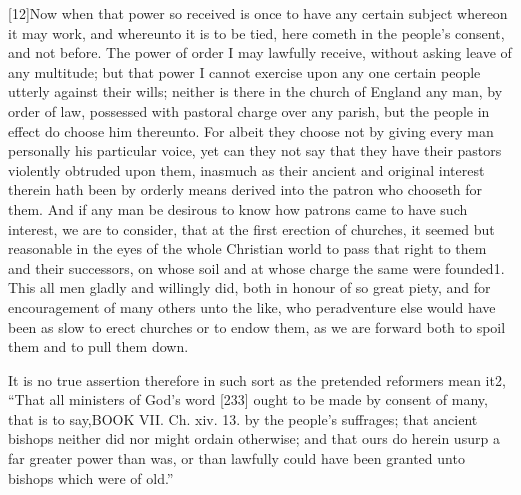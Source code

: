 [12]Now when that power so received is once to have any certain subject whereon it may work, and whereunto it is to be tied, here cometh in the people’s consent, and not before. The power of order I may lawfully receive, without asking leave of any multitude; but that power I cannot exercise upon any one certain people utterly against their wills; neither is there in the church of England any man, by order of law, possessed with pastoral charge over any parish, but the people in effect do choose him thereunto. For albeit they choose not by giving every man personally his particular voice, yet can they not say that they have their pastors violently obtruded upon them, inasmuch as their ancient and original interest therein hath been by orderly means derived into the patron who chooseth for them. And if any man be desirous to know how patrons came to have such interest, we are to consider, that at the first erection of churches, it seemed but reasonable in the eyes of the whole Christian world to pass that right to them and their successors, on whose soil and at whose charge the same were founded1. This all men gladly and willingly did, both in honour of so great piety, and for encouragement of many others unto the like, who peradventure else would have been as slow to erect churches or to endow them, as we are forward both to spoil them and to pull them down.

It is no true assertion therefore in such sort as the pretended reformers mean it2, “That all ministers of God’s word [233] ought to be made by consent of many, that is to say,BOOK VII. Ch. xiv. 13. by the people’s suffrages; that ancient bishops neither did nor might ordain otherwise; and that ours do herein usurp a far greater power than was, or than lawfully could have been granted unto bishops which were of old.”

